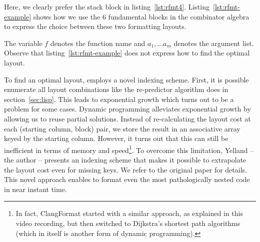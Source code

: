 Here, we clearly prefer the stack block in listing~\ref{lst:rfmt4}.
Listing~\ref{lst:rfmt-example} shows how we use the 6 fundamental blocks in the \rfmt{} combinator algebra to express the choice between these two formatting layouts.

The variable $f$ denotes the function name and $a_1, ... a_m$ denotes the argument list.
Observe that listing~\ref{lst:rfmt-example} does not express how to find the optimal layout.

To find an optimal layout, \rfmt{} employs a novel indexing scheme.
First, it is possible enumerate all layout combinations like the re-predictor algorithm does in section~\ref{sec:lisp}.
This leads to exponential growth which turns out to be a problem for some cases.
Dynamic programming alleviates exponential growth by allowing us to reuse partial solutions.
Instead of re-calculating the layout cost at each (starting column, block) pair, we store the result in an associative array keyed by the starting column.
However, it turns out that this can still be inefficient in terms of memory and speed\footnote{
  In fact, ClangFormat started with a similar approach, as explained in this\autocite{clang84:online} video recording, but then switched to Dijkstra's shortest path algorithms (which in itself is another form of dynamic programming).
}.
To overcome this limitation, Yelland -- the \rfmt{} author -- presents an indexing scheme that makes it possible to extrapolate the layout cost even for missing keys.
We refer to the original paper\autocite{yelland_new_2016} for details.
This novel approach enables \rfmt{} to format even the most pathologically nested code in near instant time.


